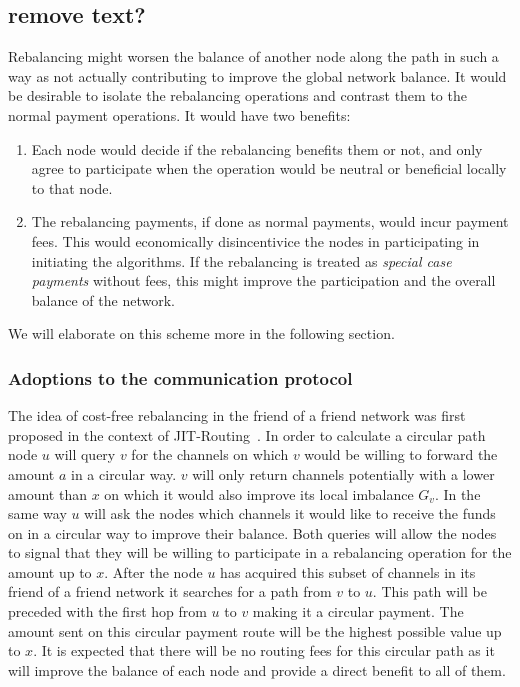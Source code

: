 \documentclass[a4paper]{paper}
\begin{document}
\subsection{remove text?}
Rebalancing might worsen the balance of another node along the path in such a way as not actually contributing to improve the global network balance. 
It would be desirable to isolate the rebalancing operations and contrast them to the normal payment operations. 
It would have two benefits:
\begin{enumerate} 
  \item Each node would decide if the rebalancing benefits them or not, and only agree to participate when the operation would be neutral or beneficial locally to that node. 
  \item The rebalancing payments, if done as normal payments, would incur payment fees. 
  This would economically disincentivice the nodes in participating in initiating the algorithms. 
  If the rebalancing is treated as {\em special case payments} without fees, 
  this might improve the participation and the overall balance of the network. 
\end{enumerate}

We will elaborate on this scheme more in the following section.



\subsubsection{Adoptions to the communication protocol}
\label{sec:lnchanges}

The idea of cost-free rebalancing in the friend of a friend network was first proposed in the context of JIT-Routing~\cite{pickhardt2019jit}.
In order to calculate a circular path node $u$ will query $v$ for the channels on which $v$ would be willing to forward the amount $a$ in a circular way.
$v$ will only return channels potentially with a lower amount than $x$ on which it would also improve its local imbalance $G_{v}$.
In the same way $u$ will ask the nodes which channels it would like to receive the funds on in a circular way to improve their balance.
Both queries will allow the nodes to signal that they will be willing to participate in a rebalancing operation for the amount up to $x$.
After the node $u$ has acquired this subset of channels in its friend of a friend network it searches for a path from $v$ to $u$.
This path will be preceded with the first hop from $u$ to $v$ making it a circular payment.
The amount sent on this circular payment route will be the highest possible value up to $x$.
It is expected that there will be no routing fees for this circular path as it will improve the balance of each node and provide a direct benefit to all of them.
\end{document}
